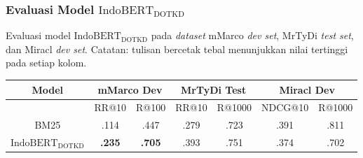 \documentclass[10pt]{beamer}
\newcommand{\f}[1]{\textit{#1}}
\newcommand{\bo}[1]{\textbf{#1}}
\begin{document}
\begin{frame}
    \frametitle{Evaluasi Model $\text{IndoBERT}_{\text{DOTKD}}$}
    Evaluasi model $\text{IndoBERT}_{\text{DOTKD}}$ pada \f{dataset} mMarco \f{dev set}, MrTyDi \f{test set}, dan Miracl \f{dev set}. Catatan: tulisan bercetak tebal menunjukkan nilai tertinggi pada setiap kolom.
    \begin{table}[!ht]
        \centering
        \footnotesize
        \begin{tabular}{|c|c|c|c|c|c|c|} \hline
            Model                             & \multicolumn{2}{c|}{mMarco Dev} &
            \multicolumn{2}{c|}{MrTyDi Test} & \multicolumn{2}{c|}{Miracl Dev}                                             \\ \hline
                                              & RR@10 & R@100 & RR@10 & R@1000 & NDCG@10 & R@1000 \\ \hline
            BM25                              & .114  & .447   & .279   & .723   & .391    & .811 \\ \hline
            $\text{IndoBERT}_{\text{DOTKD}}$  & \bo{.235}  & \bo{.705}   & .393   & .751   & .374    & .702    \\ \hline
        \end{tabular}
    \end{table}
\end{frame}
\end{document}
